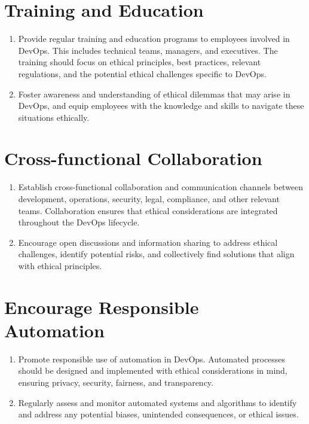 \section*{Training and Education}
        \begin{enumerate}
            \item Provide regular training and education programs to employees involved in DevOps. This includes technical teams, managers, and executives. The training should focus on ethical principles, best practices, relevant regulations, and the potential ethical challenges specific to DevOps.
            
            \item Foster awareness and understanding of ethical dilemmas that may arise in DevOps, and equip employees with the knowledge and skills to navigate these situations ethically.
        \end{enumerate}
    
\section*{Cross-functional Collaboration}
        \begin{enumerate}
            \item Establish cross-functional collaboration and communication channels between development, operations, security, legal, compliance, and other relevant teams. Collaboration ensures that ethical considerations are integrated throughout the DevOps lifecycle.
            
            \item Encourage open discussions and information sharing to address ethical challenges, identify potential risks, and collectively find solutions that align with ethical principles.
        \end{enumerate}

\section*{Encourage Responsible Automation}
        \begin{enumerate}
            \item Promote responsible use of automation in DevOps. Automated processes should be designed and implemented with ethical considerations in mind, ensuring privacy, security, fairness, and transparency.
    
            \item Regularly assess and monitor automated systems and algorithms to identify and address any potential biases, unintended consequences, or ethical issues.
        \end{enumerate}

